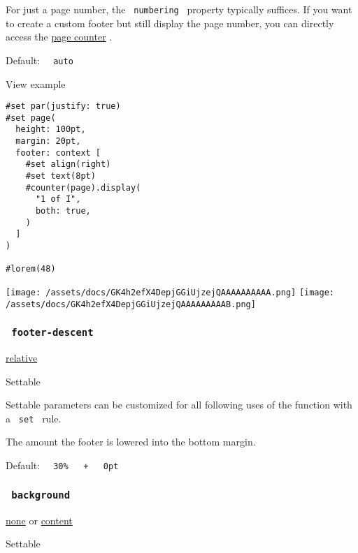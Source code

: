 For just a page number, the \texttt{\ numbering\ } property typically
suffices. If you want to create a custom footer but still display the
page number, you can directly access the
\href{/docs/reference/introspection/counter/}{page counter} .

Default: \texttt{\ }{\texttt{\ auto\ }}\texttt{\ }


View example

\begin{verbatim}
#set par(justify: true)
#set page(
  height: 100pt,
  margin: 20pt,
  footer: context [
    #set align(right)
    #set text(8pt)
    #counter(page).display(
      "1 of I",
      both: true,
    )
  ]
)

#lorem(48)
\end{verbatim}

\texttt{[image: /assets/docs/GK4h2efX4DepjGGiUjzejQAAAAAAAAAA.png]}
\texttt{[image: /assets/docs/GK4h2efX4DepjGGiUjzejQAAAAAAAAAB.png]}

\subsubsection{\texorpdfstring{\texttt{\ footer-descent\ }}{ footer-descent }}\label{parameters-footer-descent}

\href{/docs/reference/layout/relative/}{relative}

{{ Settable }}

\label{parameters-footer-descent-settable-tooltip}
Settable parameters can be customized for all following uses of the
function with a \texttt{\ set\ } rule.

The amount the footer is lowered into the bottom margin.

Default:
\texttt{\ }{\texttt{\ 30\%\ }}\texttt{\ }{\texttt{\ +\ }}\texttt{\ }{\texttt{\ 0pt\ }}\texttt{\ }

\subsubsection{\texorpdfstring{\texttt{\ background\ }}{ background }}\label{parameters-background}

\href{/docs/reference/foundations/none/}{none} {or}
\href{/docs/reference/foundations/content/}{content}

{{ Settable }}

